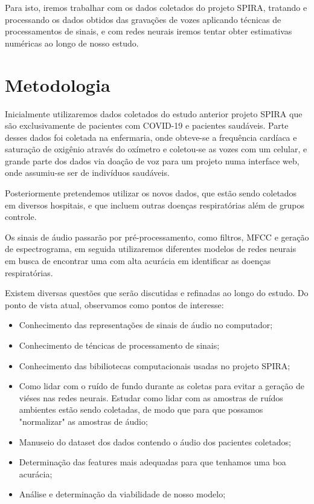 \documentclass[12pt, a4paper]{article}
\begin{document}
Para isto, iremos trabalhar com os dados coletados do projeto SPIRA, tratando e processando os dados obtidos das gravações de vozes aplicando técnicas de processamentos de sinais, e com redes neurais iremos tentar obter estimativas numéricas ao longo de nosso estudo.

\section{Metodologia}

Inicialmente utilizaremos dados coletados do estudo anterior projeto SPIRA que são exclusivamente de pacientes com COVID-19 e pacientes saudáveis. Parte desses dados foi coletada na enfermaria, onde obteve-se a frequência cardíaca e saturação de oxigênio através do oxímetro e coletou-se as vozes com um celular, e grande parte dos dados via doação de voz para um projeto numa interface web, onde assumiu-se ser de indivíduos saudáveis.

Posteriormente pretendemos utilizar os novos dados, que estão sendo coletados em diversos hospitais, e que incluem outras doenças respiratórias além de grupos controle.

Os sinais de áudio passarão por pré-processamento, como filtros, MFCC e geração de espectrograma, em seguida utilizaremos diferentes modelos de redes neurais em busca de encontrar uma com alta acurácia em identificar as doenças respiratórias.

Existem diversas questões que serão discutidas e refinadas ao longo do estudo. Do ponto de vista atual, observamos como pontos de interesse:
\begin{itemize}
    \item Conhecimento das representações de sinais de áudio no computador;
    \item Conhecimento de téncicas de processamento de sinais;
    \item Conhecimento das bibiliotecas computacionais usadas no projeto SPIRA;
    \item Como lidar com o ruído de fundo durante as coletas para evitar a geração de viéses nas redes neurais. Estudar como lidar com as amostras de ruídos ambientes estão sendo coletadas, de modo que para que possamos "normalizar" as amostras de áudio;
    \item Manuseio do dataset dos dados contendo o áudio dos pacientes coletados; 
    \item Determinação das features mais adequadas para que tenhamos uma boa acurácia;
    \item Análise e determinação da viabilidade de nosso modelo;
\end{itemize}
\end{document}

